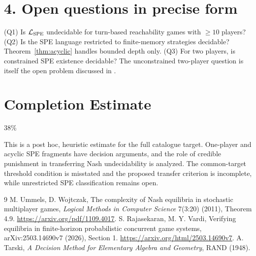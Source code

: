 \documentclass[11pt]{article}
\theoremstyle{definition}
\begin{document}
\section*{4. Open questions in precise form}
(Q1) Is $\mathcal L_{\rm SPE}$ undecidable for turn-based reachability games with $\ge10$ players?
(Q2) Is the SPE language restricted to finite-memory strategies decidable?
Theorem~\ref{thm:acyclic} handles bounded depth only.
(Q3) For two players, is constrained SPE existence decidable? The unconstrained two-player question is itself the
open problem discussed in \cite{rv}.

\section{Completion Estimate}
38\%

This is a post hoc, heuristic estimate for the full catalogue target.
One-player and acyclic SPE fragments have decision arguments, and the role of credible punishment in transferring Nash undecidability is analyzed. The common-target threshold condition is misstated and the proposed transfer criterion is incomplete, while unrestricted SPE classification remains open.

\begin{thebibliography}{9}
 M. Ummels, D. Wojtczak, The complexity of Nash equilibria in stochastic multiplayer games, \emph{Logical
Methods in Computer Science} 7(3:20) (2011), Theorem 4.9. \url{https://arxiv.org/pdf/1109.4017}.
 S. Rajasekaran, M. Y. Vardi, Verifying equilibria in finite-horizon probabilistic concurrent game systems,
arXiv:2503.14690v7 (2026), Section 1. \url{https://arxiv.org/html/2503.14690v7}.
 A. Tarski, \emph{A Decision Method for Elementary Algebra and Geometry}, RAND (1948).
\end{thebibliography}
\end{document}
